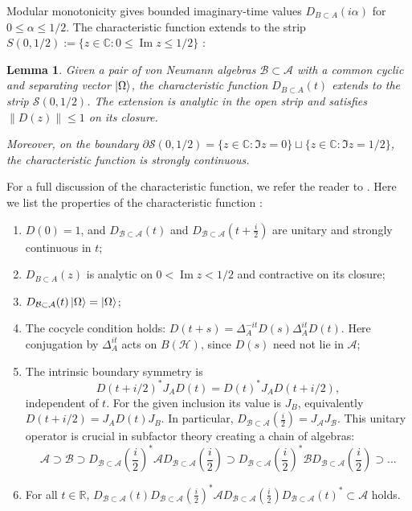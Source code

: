 \documentclass[a4paper,11pt]{article}
\newtheorem{lemma}[theorem]{Lemma}
\theoremstyle{definition}
\newcommand{\mA}{\mathcal{A}}
\newcommand{\mH}{\mathcal{H}}
\begin{document}
Modular monotonicity gives bounded imaginary-time values $D_{B\subset A}(i\alpha)$ for $0\leq\alpha\leq1/2$. The characteristic function extends to the strip $S(0,1/2):=\{z\in\mathbb C:0\leq\operatorname{Im}z\leq1/2\}$ \cite{revolutionizing}:
\begin{lemma}
    Given a pair of von Neumann algebras $\mathcal{B}\subset\mathcal{A}$ with a common cyclic and separating vector $\ket{\Omega}$, the characteristic function $D_{B\subset A}(t)$ extends to the strip $\mathcal{S}(0,1/2)$. The extension is analytic in the open strip and satisfies $\|D(z)\|\leq1$ on its closure.

    Moreover, on the boundary $\partial\mathcal{S}(0,1/2) = \{z\in\mathbb{C}:\Im{z} = 0\}\sqcup\{z\in\mathbb{C}:\Im{z} = 1/2\}$, the characteristic function is strongly continuous.
\end{lemma}
For a full discussion of the characteristic function, we refer the reader to \cite{revolutionizing}. Here we list the properties of the characteristic function \cite{revolutionizing}:
\begin{enumerate}
    \item $D(0)=1$, and $D_{\mathcal{B}\subset \mathcal{A}}(t)$ and $D_{\mathcal{B}\subset \mathcal{A}}(t +\frac{i}{2})$ are unitary and strongly continuous in $t$;
    \item $D_{B\subset A}(z)$ is analytic on $0<\operatorname{Im}z<1/2$ and contractive on its closure;
    \item $D_{\mathcal{B}\subset \mathcal{A}}(t)\ket{\Omega} = \ket{\Omega}$;
    \item The cocycle condition holds: $D(t+s)=\Delta_A^{-it}D(s)\Delta_A^{it}D(t)$. Here conjugation by $\Delta_A^{it}$ acts on $B(\mH)$, since $D(s)$ need not lie in $\mA$;
    \item The intrinsic boundary symmetry is
    \[
     D(t+i/2)^*J_A D(t)=D(t)^*J_A D(t+i/2),
    \]
    independent of $t$. For the given inclusion its value is $J_B$, equivalently
    $D(t+i/2)=J_A D(t)J_B$. In particular, $D_{\mathcal{B}\subset \mathcal{A}}(\frac{i}{2}) = J_\mathcal{A}J_\mathcal{B}$. This unitary operator is crucial in subfactor theory creating a chain of algebras:
    \begin{equation}
        \mathcal{A}\supset\mathcal{B}\supset D_{\mathcal{B}\subset \mathcal{A}}(\frac{i}{2})^*\mathcal{A}D_{\mathcal{B}\subset \mathcal{A}}(\frac{i}{2})\supset D_{\mathcal{B}\subset \mathcal{A}}(\frac{i}{2})^*\mathcal{B}D_{\mathcal{B}\subset \mathcal{A}}(\frac{i}{2})\supset...
    \end{equation}
    \item For all $t\in\mathbb{R}$, $D_{\mathcal{B}\subset \mathcal{A}}(t)D_{\mathcal{B}\subset \mathcal{A}}(\frac{i}{2})^*\mathcal{A}D_{\mathcal{B}\subset \mathcal{A}}(\frac{i}{2})D_{\mathcal{B}\subset \mathcal{A}}(t)^*\subset\mathcal{A}$ holds.
\end{enumerate}
\end{document}
